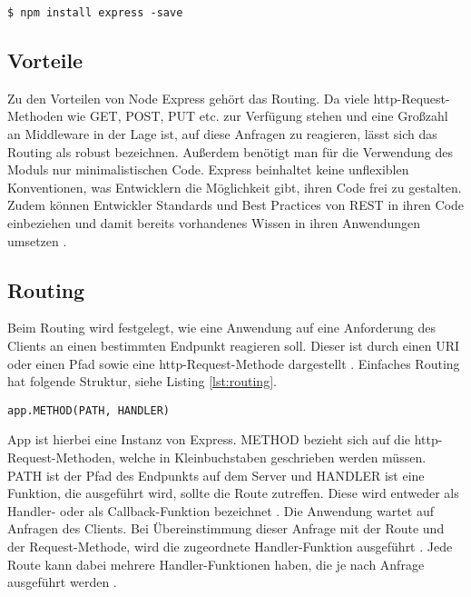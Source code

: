 \begin{lstlisting}[caption={Express Modul installieren}, label={lst:installNodeExpress}]
    $ npm install express -save
\end{lstlisting}


\subsection{Vorteile}

Zu den Vorteilen von Node Express gehört das Routing. Da viele http-Request-Methoden wie GET, POST, PUT etc. zur Verfügung stehen und eine Großzahl an Middleware in der Lage ist, auf diese Anfragen zu reagieren, lässt sich das Routing als robust bezeichnen. Außerdem benötigt man für die Verwendung des Moduls nur minimalistischen Code. Express beinhaltet keine unflexiblen Konventionen, was Entwicklern die Möglichkeit gibt, ihren Code frei zu gestalten.
Zudem können Entwickler Standards und Best Practices von REST in ihren Code einbeziehen und damit bereits vorhandenes Wissen in ihren Anwendungen umsetzen \cite[S.16f.]{neins}.

\subsection{Routing}

Beim Routing wird festgelegt, wie eine Anwendung auf eine Anforderung des Clients an einen bestimmten Endpunkt reagieren soll. Dieser ist durch einen URI oder einen Pfad sowie eine http-Request-Methode dargestellt \cite{nvier}.
Einfaches Routing hat folgende Struktur, siehe Listing \ref*{lst:routing}.

\begin{lstlisting}[caption={Routing in Express}, label={lst:routing}]
    app.METHOD(PATH, HANDLER)
\end{lstlisting}


App ist hierbei eine Instanz von Express. METHOD bezieht sich auf die http-Request-Methoden, welche in Kleinbuchstaben geschrieben werden müssen. PATH ist der Pfad des Endpunkts auf dem Server und HANDLER ist eine Funktion, die ausgeführt wird, sollte die Route zutreffen. Diese wird entweder als Handler- oder als Callback-Funktion bezeichnet \cite{nvier}.
Die Anwendung wartet auf Anfragen des Clients. Bei Übereinstimmung dieser Anfrage mit der Route und der Request-Methode, wird die zugeordnete Handler-Funktion ausgeführt \cite{nfunf}. Jede Route kann dabei mehrere Handler-Funktionen haben, die je nach Anfrage ausgeführt werden \cite{nvier}.

